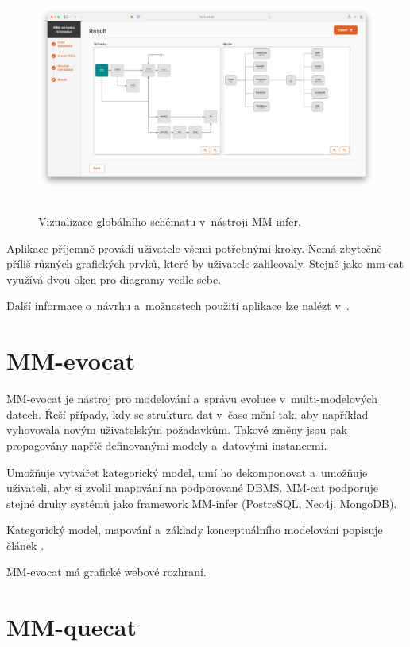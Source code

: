 \begin{figure}[htb]
  \centering
  \includegraphics[height=75mm]{../img/mm-infer-result}
  \caption{Vizualizace globálního schématu v~nástroji MM-infer.}
  \label{obr01:mm-infer-result}
\end{figure}

Aplikace příjemně provádí uživatele všemi potřebnými kroky. Nemá zbytečně příliš různých grafických prvků, které by uživatele zahlcovaly. Stejně jako mm-cat využívá dvou oken pro diagramy vedle sebe.

Další informace o~návrhu a~možnostech použití aplikace lze nalézt v~\cite{MM_infer}.

\section{MM-evocat}

MM-evocat je nástroj pro modelování a~správu evoluce v~multi-modelových datech. Řeší případy, kdy se struktura dat v~čase mění tak, aby například vyhovovala novým uživatelským požadavkům. Takové změny jsou pak propagovány napříč definovanými modely a~datovými instancemi.

Umožňuje vytvářet kategorický model, umí ho dekomponovat a~umožňuje uživateli, aby si zvolil mapování na podporované DBMS. MM-cat podporuje stejné druhy systémů jako framework MM-infer (PostreSQL, Neo4j, MongoDB).

Kategorický model, mapování a~základy konceptuálního modelování popisuje článek \cite{MM_evocat}.

MM-evocat má grafické webové rozhraní.


\section{MM-quecat}

